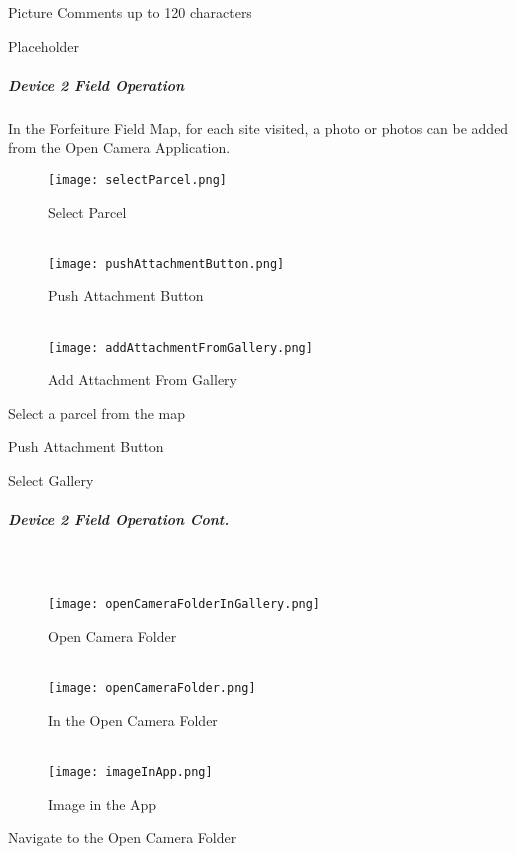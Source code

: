 \documentclass[class=article , crop=false, titlepage, twoside, multi={itemize, figure, verbatim}, float=false]{standalone}
\begin{document}
\noindent Picture Comments up to 120 characters\\
\vspace{2in}

\noindent Placeholder\\

\clearpage
\subparagraph{Device 2 Field Operation}In the Forfeiture Field Map, for each site visited, a photo or photos can be added from the Open Camera Application.

\begin{wrapfigure}{r}{0.5\textwidth}
\centering
\texttt{[image: selectParcel.png]}
\caption {Select Parcel}
\vspace{.15in}
\HRule \\[.4cm] %
\vspace{.15in}
\texttt{[image: pushAttachmentButton.png]}
\caption{Push Attachment Button}
\vspace{.15in}
\HRule \\[.4cm] %
\vspace{.15in}
\texttt{[image: addAttachmentFromGallery.png]}
\caption{Add Attachment From Gallery}
\end{wrapfigure}
\vspace{.5in}

Select a parcel from the map\\
\vspace{2in}

\noindent Push Attachment Button
\vspace{2in}

\noindent Select Gallery

\clearpage
\subparagraph*{Device 2 Field Operation Cont.} 
\subparagraph*{\\}

\begin{wrapfigure}{r}{0.5\textwidth}
\centering
\texttt{[image: openCameraFolderInGallery.png]}
\caption {Open Camera Folder}
\vspace{.2in}
\HRule \\[.4cm] %
\vspace{.2in}
\texttt{[image: openCameraFolder.png]}
\caption{In the Open Camera Folder}
\vspace{.2in}
\HRule \\[.4cm] %
\vspace{.2in}
\texttt{[image: imageInApp.png]}
\caption{Image in the App}
\end{wrapfigure}
Navigate to the Open Camera Folder\\
\vspace{2in}
\end{document}
